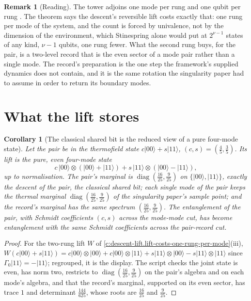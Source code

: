 \documentclass[11pt]{article}
\newtheorem{corollary}[theorem]{Corollary}
\theoremstyle{definition}
\newtheorem{remark}[theorem]{Remark}
\theoremstyle{plain}
\providecommand{\G}{}\renewcommand{\G}{\Gamma}
\providecommand{\ket}{}\renewcommand{\ket}[1]{|#1\rangle}
\begin{document}
\begin{remark}[Reading]\label{c:note.descent-lift.reading}
The tower adjoins one mode per rung and one qubit per rung \cite[Thm.~4.2]{ButlerT3}. The theorem says the descent's reversible lift costs exactly that: one rung per mode of the system, and the count is forced by univalence, not by the dimension of the environment, which Stinespring alone would put at $2^{\nu-1}$ states of any kind, $\nu - 1$ qubits, one rung fewer. What the second rung buys, for the pair, is a two-level record that is the even sector of a mode pair rather than a single mode. The record's preparation is the one step the framework's supplied dynamics does not contain, and it is the same rotation the singularity paper had to assume in order to return its boundary modes.
\end{remark}

\section{What the lift stores}

\begin{corollary}[The classical shared bit is the reduced view of a pure four-mode state]\label{c:descent-lift.classical-shared-bit-reduced-view-pure}
Let the pair be in the thermofield state $c\ket{00} + s\ket{11}$, $(c, s) = (\tfrac45, \tfrac35)$. Its lift is the pure, even four-mode state
\[
c\,\ket{00} \otimes (\ket{00} + \ket{11}) + s\,\ket{11} \otimes (\ket{00} - \ket{11}),
\]
up to normalisation. The pair's marginal is $\operatorname{diag}(\tfrac{16}{25}, \tfrac{9}{25})$ on $\{\ket{00}, \ket{11}\}$, exactly the descent of the pair, the classical shared bit; each single mode of the pair keeps the thermal marginal $\operatorname{diag}(\tfrac{16}{25}, \tfrac{9}{25})$ of the singularity paper's sample point; and the record's marginal has the same spectrum $(\tfrac{16}{25}, \tfrac{9}{25})$. The entanglement of the pair, with Schmidt coefficients $(c, s)$ across the mode-mode cut, has become entanglement with the same Schmidt coefficients across the pair-record cut.
\end{corollary}
\begin{proof}
For the two-rung lift $W$ of \ref{c:descent-lift.lift-costs-one-rung-per-mode}(iii), $W(c\ket{00} + s\ket{11}) = c\ket{00}\otimes\ket{00} + c\ket{00}\otimes\ket{11} + s\ket{11}\otimes\ket{00} - s\ket{11}\otimes\ket{11}$ since $\G_{0}\ket{11} = -\ket{11}$; regrouped, it is the display. The script checks the joint state is even, has norm two, restricts to $\operatorname{diag}(\tfrac{16}{25}, \tfrac{9}{25})$ on the pair's algebra and on each mode's algebra, and that the record's marginal, supported on its even sector, has trace $1$ and determinant $\tfrac{144}{625}$, whose roots are $\tfrac{16}{25}$ and $\tfrac{9}{25}$.

\end{proof}
\end{document}
